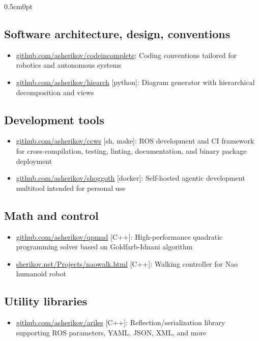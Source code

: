 \documentclass[a4paper,10pt]{report}
\newcommand{\cvurl}[2]{\href{#1://#2}{\url{#2}}}
\newenvironment{cvindent}{\begin{adjustwidth}{0.5cm}{0pt}}{\end{adjustwidth}}
\begin{document}
\begin{cvindent}
\subsection{Software architecture, design, conventions}
    \begin{itemize}
        \item \cvurl{https}{github.com/asherikov/codeincomplete}: Coding
            conventions tailored for robotics and autonomous systems
       \item \cvurl{https}{github.com/asherikov/hiearch} [python]: Diagram
           generator with hierarchical decomposition and views
    \end{itemize}

\subsection{Development tools}
    \begin{itemize}
        \item \cvurl{https}{github.com/asherikov/ccws} [sh, make]: ROS
            development and CI framework for cross-compilation, testing,
            linting, documentation, and binary package deployment
        \item \cvurl{https}{github.com/asherikov/shoggoth} [docker]:
            Self-hosted agentic development multitool intended for personal use
    \end{itemize}

\subsection{Math and control}
    \begin{itemize}
        \item \cvurl{https}{github.com/asherikov/qpmad} [C++]: High-performance
            quadratic programming solver based on Goldfarb-Idnani algorithm
        \item \cvurl{http}{sherikov.net/Projects/naowalk.html} [C++]: Walking
            controller for Nao humanoid robot
    \end{itemize}

\subsection{Utility libraries}
    \begin{itemize}
        \item \cvurl{https}{github.com/asherikov/ariles} [C++]:
            Reflection/serialization library supporting ROS parameters, YAML,
            JSON, XML, and more


\end{itemize}
\end{cvindent}
\end{document}
